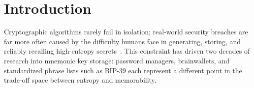 \documentclass[journal,article,submit,pdftex,moreauthors]{Definitions/mdpi}
\newcommand{\add}[1]{#1}
\newcommand{\remove}[1]{}
\newcommand{\add}[1]{\added{#1}}
\newcommand{\remove}[1]{\deleted{#1}}
\begin{document}




\section{Introduction}

\remove{Secure cryptographic key management remains one of the most persistent usability challenges in modern security systems. While cryptographic primitives themselves have achieved a high degree of mathematical maturity, real-world security failures are frequently caused not by algorithmic weaknesses, but by the difficulty humans face in generating, storing, and reliably recalling high-entropy secrets. This mismatch between human cognitive capabilities and cryptographic requirements has motivated a wide range of mnemonic key storage approaches, including password-based systems, brainwallets, and standardized mnemonic phrases such as BIP-39.}\add{Cryptographic algorithms rarely fail in isolation; real-world security breaches are far more often caused by the difficulty humans face in generating, storing, and reliably recalling high-entropy secrets~\cite{Adams1999}. This constraint has driven two decades of research into mnemonic key storage: password managers, brainwallets, and standardized phrase lists such as BIP-39 each represent a different point in the trade-off space between entropy and memorability.}
\end{document}
